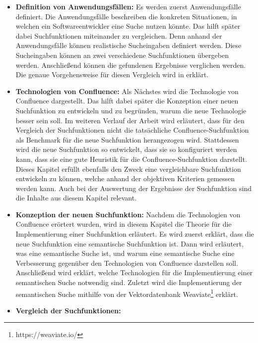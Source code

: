 \begin{itemize}
   \item \textbf{Definition von Anwendungsfällen:}
         Es werden zuerst Anwendungsfälle definiert.
         Die Anwendungsfälle beschreiben die konkreten Situationen, in welchen ein Softwareentwickler eine Suche nutzen könnte.
         Das hilft später dabei Suchfunktionen miteinander zu vergleichen.
         Denn anhand der Anwendungsfälle können realistische Sucheingaben definiert werden.
         Diese Sucheingaben können an zwei verschiedene Suchfunktionen übergeben werden.
         Anschließend können die gefundenen Ergebnisse verglichen werden.
         Die genaue Vorgehensweise für diesen Vergleich wird in  erklärt.
   \item \textbf{Technologien von Confluence:}
         Als Nächstes wird die Technologie von Confluence dargestellt.
         Das hilft dabei später die Konzeption einer neuen Suchfunktion zu entwickeln und zu begründen, warum die neue Technologie besser sein soll.
         Im weiteren Verlauf der Arbeit wird erläutert, dass für den Vergleich der Suchfunktionen nicht die tatsächliche Confluence-Suchfunktion als Benchmark für die neue Suchfunktion herangezogen wird.
         Stattdessen wird die neue Suchfunktion so entwickelt, dass sie so konfiguriert werden kann, dass sie eine gute Heuristik für die Confluence-Suchfunktion darstellt.
         Dieses Kapitel erfüllt ebenfalls den Zweck eine vergleichbare Suchfunktion entwickeln zu können, welche anhand der objektiven Kriterien gemessen werden kann.
         Auch bei der Auswertung der Ergebnisse der Suchfunktion sind die Inhalte aus diesem Kapitel relevant.
   \item \textbf{Konzeption der neuen Suchfunktion:}
         Nachdem die Technologien von Confluence erörtert wurden, wird in diesem Kapitel die Theorie für die Implementierung einer Suchfunktion erläutert.
         Es wird zuerst erklärt, dass die neue Suchfunktion eine semantische Suchfunktion ist.
         Dann wird erläutert, was eine semantische Suche ist, und warum eine semantische Suche eine Verbesserung gegenüber den Technologien von Confluence darstellen soll.
         Anschließend wird erklärt, welche Technologien für die Implementierung einer semantischen Suche notwendig sind.
         Zuletzt wird die Implementierung der semantischen Suche mithilfe von der Vektordatenbank Weaviate\footnote{https://weaviate.io/} erklärt.
   \item \textbf{Vergleich der Suchfunktionen:}

\end{itemize}
